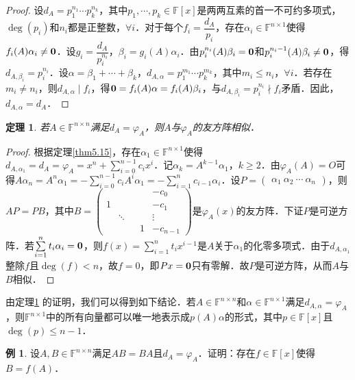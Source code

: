 \documentclass[a4paper,fontset=windows]{ctexbook}
\newtheorem{theorem}{定理}[chapter]
\theoremstyle{definition}
\newtheorem{example}{例}[chapter]
\renewcommand{\le}{\leqslant}
\renewcommand{\ge}{\geqslant}
\begin{document}
\begin{proof}
设$d_A=p_1^{n_1}\cdots p_k^{n_k}$，其中$p_1,\cdots,p_k\in\mathbb{F}[x]$是两两互素的首一不可约多项式，$\deg(p_i)$和$n_i$都是正整数，$\forall i$．对于每个$f_i=\dfrac{d_A}{p_i}$，存在$\alpha_i\in\mathbb{F}^{n\times 1}$使得$f_i(A)\alpha_i\ne{\bf 0}$．设$g_i=\dfrac{d_A}{p_i^{n_i}}$，$\beta_i=g_i(A)\alpha_i$．由$p_i^{n_i}(A)\beta_i={\bf 0}$和$p_i^{n_i-1}(A)\beta_i\ne{\bf 0}$，得$d_{A,\beta_i}=p_i^{n_i}$．设$\alpha=\beta_1+\cdots+\beta_k$，$d_{A,\alpha}=p_1^{m_1}\cdots p_k^{m_k}$，其中$m_i\le n_i$，$\forall i$．若存在$m_i\ne n_i$，则$d_{A,\alpha}\mid f_i$，得${\bf 0}=f_i(A)\alpha=f_i(A)\beta_i$，与$d_{A,\beta_i}=p_i^{n_i}\nmid f_i$矛盾．因此，$d_{A,\alpha}=d_A$．
\end{proof}

\begin{theorem}\label{thm5.16}
若$A\in\mathbb{F}^{n\times n}$满足$d_A=\varphi_A$，则$A$与$\varphi_A$的友方阵相似．
\end{theorem}

\begin{proof}
根据定理\ref{thm5.15}，存在$\alpha_1\in\mathbb{F}^{n\times 1}$使得$d_{A,\alpha_1}=d_A=\varphi_A=x^n+\sum\limits_{i=0}^{n-1}c_ix^i$．记$\alpha_k=A^{k-1}\alpha_1$，$k\ge 2$．由$\varphi_A(A)=O$可得$A\alpha_n=A^n\alpha_1=-\sum\limits_{i=0}^{n-1}c_iA^i\alpha_1=-\sum\limits_{i=1}^nc_{i-1}\alpha_i$．设$P=\begin{pmatrix}\alpha_1~\alpha_2~\cdots~\alpha_n\end{pmatrix}$，则$AP=PB$，其中$B=\begin{pmatrix}&&&&-c_0 \\ 1&&&&-c_1 \\ &\ddots&&&\vdots \\ &&&1&-c_{n-1}\end{pmatrix}$是$\varphi_A(x)$的友方阵．下证$P$是可逆方阵．若$\sum\limits_{i=1}^nt_i\alpha_i={\bf 0}$，则$f(x)=\sum\limits_{i=1}^nt_ix^{i-1}$是$A$关于$\alpha_1$的化零多项式．由于$d_{A,\alpha_1}$整除$f$且$\deg(f)<n$，故$f=0$，即$Px={\bf 0}$只有零解．故$P$是可逆方阵，从而$A$与$B$相似．
\end{proof}

由定理\ref{thm5.16} 的证明，我们可以得到如下结论．若$A\in\mathbb{F}^{n\times n}$和$\alpha\in\mathbb{F}^{n\times 1}$满足$d_{A,\alpha}=\varphi_A$，则$\mathbb{F}^{n\times 1}$中的所有向量都可以唯一地表示成$p(A)\alpha$的形式，其中$p\in\mathbb{F}[x]$且$\deg(p)\le n-1$．

\begin{example}
设$A,B\in\mathbb{F}^{n\times n}$满足$AB=BA$且$d_A=\varphi_A$．证明：存在$f\in\mathbb{F}[x]$使得$B=f(A)$．
\end{example}
\end{document}
